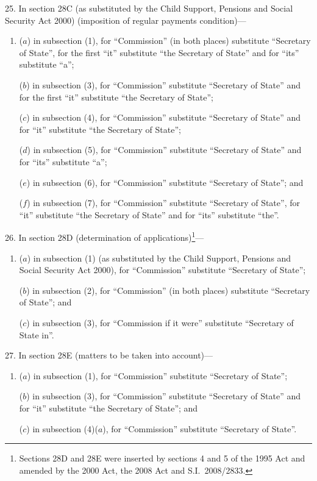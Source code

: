 \documentclass[12pt,a4paper]{article}
\begin{document}
\medskip

25.  In section 28C (as substituted by the Child Support, Pensions and Social Security Act 2000) (imposition of regular payments condition)—
\begin{enumerate}\item[]
($a$) in subsection (1), for “Commission” (in both places) substitute “Secretary of State”, for the first “it” substitute “the Secretary of State” and for “its” substitute “a”;

($b$) in subsection (3), for “Commission” substitute “Secretary of State” and for the first “it” substitute “the Secretary of State”;

($c$) in subsection (4), for “Commission” substitute “Secretary of State” and for “it” substitute “the Secretary of State”;

($d$) in subsection (5), for “Commission” substitute “Secretary of State” and for “its” substitute “a”;

($e$) in subsection (6), for “Commission” substitute “Secretary of State”; and

($f$) in subsection (7), for “Commission” substitute “Secretary of State”, for “it” substitute “the Secretary of State” and for “its” substitute “the”.
\end{enumerate}

\medskip

26.  In section 28D (determination of applications)\footnote{Sections 28D and 28E were inserted by sections 4 and 5 of the 1995 Act and amended by the 2000 Act, the 2008 Act and S.I.~2008/2833.}—
\begin{enumerate}\item[]
($a$) in subsection (1) (as substituted by the Child Support, Pensions and Social Security Act 2000), for “Commission” substitute “Secretary of State”;

($b$) in subsection (2), for “Commission” (in both places) substitute “Secretary of State”; and

($c$) in subsection (3), for “Commission if it were” substitute “Secretary of State in”.
\end{enumerate}

\medskip

27.  In section 28E (matters to be taken into account)—
\begin{enumerate}\item[]
($a$) in subsection (1), for “Commission” substitute “Secretary of State”;

($b$) in subsection (3), for “Commission” substitute “Secretary of State” and for “it” substitute “the Secretary of State”; and

($c$) in subsection (4)($a$), for “Commission” substitute “Secretary of State”.
\end{enumerate}
\end{document}
